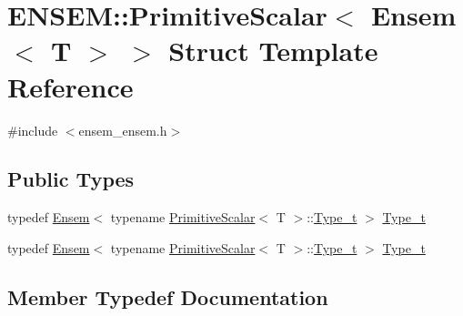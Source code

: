 \hypertarget{structENSEM_1_1PrimitiveScalar_3_01Ensem_3_01T_01_4_01_4}{}\section{E\+N\+S\+EM\+:\+:Primitive\+Scalar$<$ Ensem$<$ T $>$ $>$ Struct Template Reference}
\label{structENSEM_1_1PrimitiveScalar_3_01Ensem_3_01T_01_4_01_4}


{\ttfamily \#include $<$ensem\+\_\+ensem.\+h$>$}

\subsection*{Public Types}
\begin{DoxyCompactItemize}
\item 
typedef \mbox{\hyperlink{classENSEM_1_1Ensem}{Ensem}}$<$ typename \mbox{\hyperlink{structENSEM_1_1PrimitiveScalar}{Primitive\+Scalar}}$<$ T $>$\+::\mbox{\hyperlink{structENSEM_1_1PrimitiveScalar_3_01Ensem_3_01T_01_4_01_4_af9a7554dcb219c3d60465d27682b73bf}{Type\+\_\+t}} $>$ \mbox{\hyperlink{structENSEM_1_1PrimitiveScalar_3_01Ensem_3_01T_01_4_01_4_af9a7554dcb219c3d60465d27682b73bf}{Type\+\_\+t}}
\item 
typedef \mbox{\hyperlink{classENSEM_1_1Ensem}{Ensem}}$<$ typename \mbox{\hyperlink{structENSEM_1_1PrimitiveScalar}{Primitive\+Scalar}}$<$ T $>$\+::\mbox{\hyperlink{structENSEM_1_1PrimitiveScalar_3_01Ensem_3_01T_01_4_01_4_af9a7554dcb219c3d60465d27682b73bf}{Type\+\_\+t}} $>$ \mbox{\hyperlink{structENSEM_1_1PrimitiveScalar_3_01Ensem_3_01T_01_4_01_4_af9a7554dcb219c3d60465d27682b73bf}{Type\+\_\+t}}
\end{DoxyCompactItemize}


\subsection{Member Typedef Documentation}
\mbox{\label{structENSEM_1_1PrimitiveScalar_3_01Ensem_3_01T_01_4_01_4_af9a7554dcb219c3d60465d27682b73bf}} 
